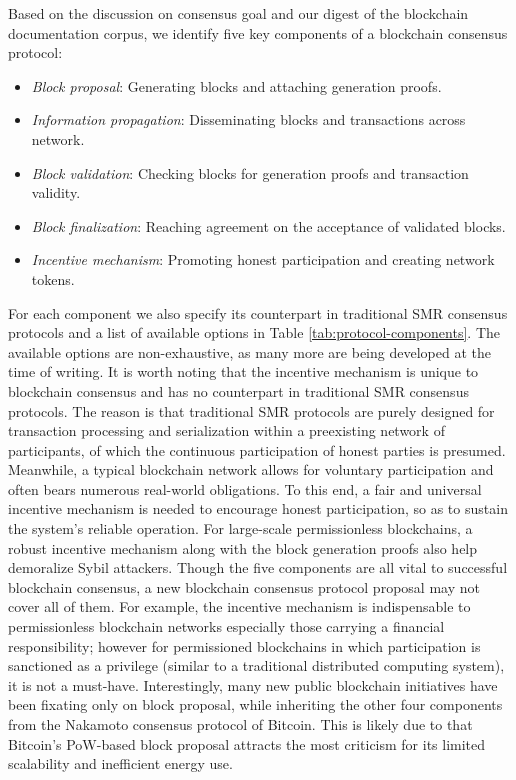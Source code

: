 {\color{\rcolor}Based on the discussion on consensus goal and our digest of the blockchain documentation corpus, we identify five key components of a blockchain consensus protocol:
\begin{itemize}
    \item \emph{Block proposal}: Generating blocks and attaching generation proofs.
    \item \emph{Information propagation}: Disseminating blocks and transactions across network.
    \item \emph{Block validation}: Checking blocks for generation proofs and transaction validity.
    \item \emph{Block finalization}: Reaching agreement on the acceptance of validated blocks.
    \item \emph{Incentive mechanism}: Promoting honest participation and creating network tokens.
\end{itemize}
}
For each component we also specify its counterpart in traditional SMR consensus protocols and a list of available options in Table \ref{tab:protocol-components}. The available options are non-exhaustive, as many more are being developed at the time of writing.
{\color{\rcolor}
It is worth noting that the incentive mechanism is unique to blockchain consensus and has no counterpart in traditional SMR consensus protocols. The reason is that traditional SMR protocols are purely designed for transaction processing and serialization within a preexisting network of participants, of which the continuous participation of honest parties is presumed.
{\color{\rrcolor}
Meanwhile, a typical blockchain network allows for voluntary participation and often bears numerous real-world obligations. To this end, a fair and universal incentive mechanism is needed to encourage honest participation, so as to sustain the system's reliable operation. For large-scale permissionless blockchains, a robust incentive mechanism along with the block generation proofs also help demoralize Sybil attackers.
}
}
Though the five components are all vital to successful blockchain consensus, a new blockchain consensus protocol proposal may not cover all of them. For example, the incentive mechanism is indispensable to {\color{\rcolor}permissionless} blockchain networks especially those carrying a financial responsibility;  {\color{\rcolor}however for permissioned blockchains in which participation is sanctioned as a privilege (similar to a traditional distributed computing system), it is not a must-have}. Interestingly, many new public blockchain initiatives have been fixating only on block proposal, while inheriting the other four components from the Nakamoto consensus protocol of Bitcoin. This is likely due to that Bitcoin's PoW-based block proposal attracts the most criticism for its limited scalability and inefficient energy use. 
